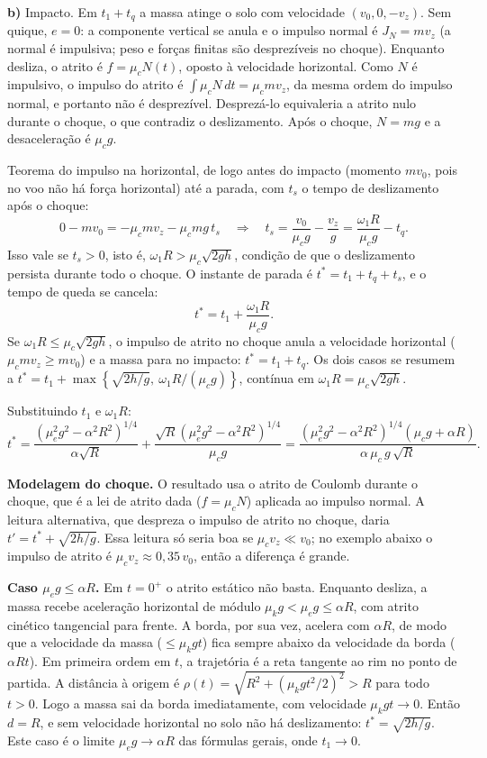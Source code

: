 \documentclass{article}%
\begin{document}
\textbf{b)} Impacto. Em $t_1+t_q$ a massa atinge o solo com velocidade $(v_0,0,-v_z)$. Sem quique, $e=0$: a componente vertical se anula e o impulso normal é $J_N=mv_z$ (a normal é impulsiva; peso e forças finitas são desprezíveis no choque). Enquanto desliza, o atrito é $f=\mu_cN(t)$, oposto à velocidade horizontal. Como $N$ é impulsivo, o impulso do atrito é $\int\mu_cN\,dt=\mu_cmv_z$, da mesma ordem do impulso normal, e portanto não é desprezível. Desprezá-lo equivaleria a atrito nulo durante o choque, o que contradiz o deslizamento. Após o choque, $N=mg$ e a desaceleração é $\mu_cg$.

Teorema do impulso na horizontal, de logo antes do impacto (momento $mv_0$, pois no voo não há força horizontal) até a parada, com $t_s$ o tempo de deslizamento após o choque:
\[
0-mv_0=-\mu_cmv_z-\mu_cmg\,t_s\quad\Rightarrow\quad t_s=\frac{v_0}{\mu_cg}-\frac{v_z}{g}=\frac{\omega_1R}{\mu_cg}-t_q .
\]
Isso vale se $t_s>0$, isto é, $\omega_1R>\mu_c\sqrt{2gh}$, condição de que o deslizamento persista durante todo o choque. O instante de parada é $t^\ast=t_1+t_q+t_s$, e o tempo de queda se cancela:
\[
t^\ast=t_1+\frac{\omega_1R}{\mu_cg}.
\]
Se $\omega_1R\le\mu_c\sqrt{2gh}$, o impulso de atrito no choque anula a velocidade horizontal ($\mu_cmv_z\ge mv_0$) e a massa para no impacto: $t^\ast=t_1+t_q$. Os dois casos se resumem a $t^\ast=t_1+\max\left\{\sqrt{2h/g},\ \omega_1R/(\mu_cg)\right\}$, contínua em $\omega_1R=\mu_c\sqrt{2gh}$.

Substituindo $t_1$ e $\omega_1R$:
\[
t^\ast=\frac{\left(\mu_e^2g^2-\alpha^2R^2\right)^{1/4}}{\alpha\sqrt R}+\frac{\sqrt R\left(\mu_e^2g^2-\alpha^2R^2\right)^{1/4}}{\mu_cg}=\frac{\left(\mu_e^2g^2-\alpha^2R^2\right)^{1/4}\left(\mu_cg+\alpha R\right)}{\alpha\,\mu_c\,g\,\sqrt R}.
\]

\textbf{Modelagem do choque.} O resultado usa o atrito de Coulomb durante o choque, que é a lei de atrito dada ($f=\mu_cN$) aplicada ao impulso normal. A leitura alternativa, que despreza o impulso de atrito no choque, daria $t'=t^\ast+\sqrt{2h/g}$. Essa leitura só seria boa se $\mu_cv_z\ll v_0$; no exemplo abaixo o impulso de atrito é $\mu_cv_z\approx0{,}35\,v_0$, então a diferença é grande.

\textbf{Caso $\mu_eg\le\alpha R$.} Em $t=0^+$ o atrito estático não basta. Enquanto desliza, a massa recebe aceleração horizontal de módulo $\mu_kg<\mu_eg\le\alpha R$, com atrito cinético tangencial para frente. A borda, por sua vez, acelera com $\alpha R$, de modo que a velocidade da massa ($\le\mu_kgt$) fica sempre abaixo da velocidade da borda ($\alpha Rt$). Em primeira ordem em $t$, a trajetória é a reta tangente ao rim no ponto de partida. A distância à origem é $\rho(t)=\sqrt{R^2+(\mu_kgt^2/2)^2}>R$ para todo $t>0$. Logo a massa sai da borda imediatamente, com velocidade $\mu_kgt\to0$. Então $d=R$, e sem velocidade horizontal no solo não há deslizamento: $t^\ast=\sqrt{2h/g}$. Este caso é o limite $\mu_eg\to\alpha R$ das fórmulas gerais, onde $t_1\to0$.
\end{document}
